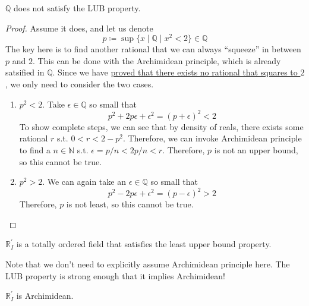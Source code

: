   \begin{theorem}
    $\mathbb{Q}$ does not satisfy the LUB property. 
  \end{theorem}
  \begin{proof}
    Assume it does, and let us denote 
    \begin{equation}
      p \coloneqq \sup \{x \mid \mathbb{Q} \mid x^2 < 2\} \in \mathbb{Q}
    \end{equation}
    The key here is to find another rational that we can always ``squeeze'' in between $p$ and $2$. This can be done with the Archimidean principle, which is already satsified in $\mathbb{Q}$. Since we have \href{thm:sqrt2-irrational}{proved that there exists no rational that squares to $2$}, we only need to consider the two cases. 
    \begin{enumerate}
      \item $p^2 < 2$. Take $\epsilon \in \mathbb{Q}$ so small that 
      \begin{equation}
        p^2 + 2 p \epsilon + \epsilon^2 = (p + \epsilon)^2 < 2
      \end{equation}
      To show complete steps, we can see that by density of reals, there exists some rational $r$ s.t. $0 < r < 2 - p^2$. Therefore, we can invoke Archimidean principle to find a $n \in \mathbb{N}$ s.t. $\epsilon = p/n < 2 p/n < r$. Therefore, $p$ is not an upper bound, so this cannot be true. 

      \item $p^2 > 2$. We can again take an $\epsilon \in \mathbb{Q}$ so small that 
      \begin{equation}
        p^2 - 2 p \epsilon + \epsilon^2 = (p - \epsilon)^2 > 2
      \end{equation}
      Therefore, $p$ is not least, so this cannot be true. 
    \end{enumerate}
  \end{proof}

  \begin{definition}
    $\mathbb{R}_I^\prime$ is a totally ordered field that satisfies the least upper bound property.
  \end{definition}

  Note that we don't need to explicitly assume Archimidean principle here. The LUB property is strong enough that it implies Archimidean!

  \begin{theorem}
    $\mathbb{R}_I^\prime$ is Archimidean. 
  \end{theorem}

